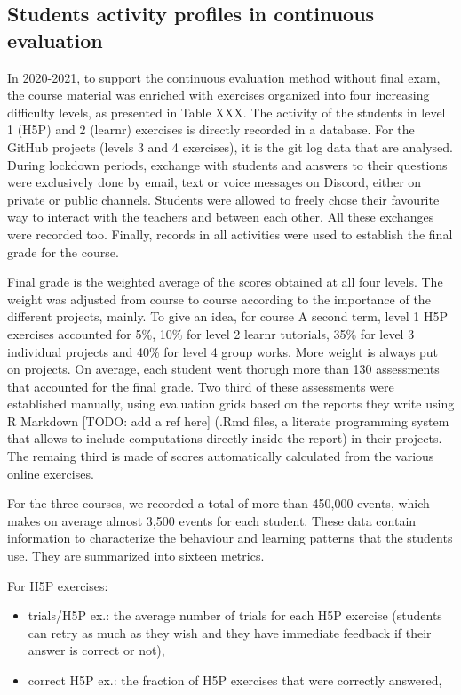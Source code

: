 \documentclass[
]{article}
\providecommand{\tightlist}{%
  \setlength{\itemsep}{0pt}\setlength{\parskip}{0pt}}
\begin{document}
\hypertarget{students-activity-profiles-in-continuous-evaluation}{%
\subsection{Students activity profiles in continuous
evaluation}\label{students-activity-profiles-in-continuous-evaluation}}

In 2020-2021, to support the continuous evaluation method without final
exam, the course material was enriched with exercises organized into
four increasing difficulty levels, as presented in Table XXX. The
activity of the students in level 1 (H5P) and 2 (learnr) exercises is
directly recorded in a database. For the GitHub projects (levels 3 and 4
exercises), it is the git log data that are analysed. During lockdown
periods, exchange with students and answers to their questions were
exclusively done by email, text or voice messages on Discord, either on
private or public channels. Students were allowed to freely chose their
favourite way to interact with the teachers and between each other. All
these exchanges were recorded too. Finally, records in all activities
were used to establish the final grade for the course.

Final grade is the weighted average of the scores obtained at all four
levels. The weight was adjusted from course to course according to the
importance of the different projects, mainly. To give an idea, for
course A second term, level 1 H5P exercises accounted for 5\%, 10\% for
level 2 learnr tutorials, 35\% for level 3 individual projects and 40\%
for level 4 group works. More weight is always put on projects. On
average, each student went thorugh more than 130 assessments that
accounted for the final grade. Two third of these assessments were
established manually, using evaluation grids based on the reports they
write using R Markdown {[}TODO: add a ref here{]} (.Rmd files, a
literate programming system that allows to include computations directly
inside the report) in their projects. The remaing third is made of
scores automatically calculated from the various online exercises.

For the three courses, we recorded a total of more than 450,000 events,
which makes on average almost 3,500 events for each student. These data
contain information to characterize the behaviour and learning patterns
that the students use. They are summarized into sixteen metrics.

For H5P exercises:

\begin{itemize}
\tightlist
\item
  trials/H5P ex.: the average number of trials for each H5P exercise
  (students can retry as much as they wish and they have immediate
  feedback if their answer is correct or not),
\item
  correct H5P ex.: the fraction of H5P exercises that were correctly
  answered,
\end{itemize}
\end{document}
